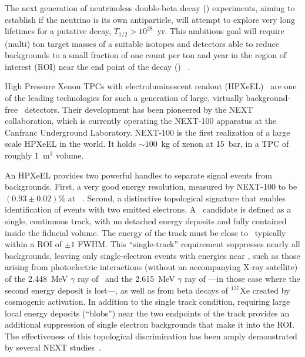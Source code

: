 \documentclass[pdflatex,iicol,sn-mathphys-num]{sn-jnl}
\begin{document}
The next generation of neutrinoless double-beta decay (\bbonu) experiments, aiming to establish if the neutrino is its own antiparticle, will attempt to explore very long lifetimes for a putative decay, $T_{1/2} > 10^{28}$~yr. This ambitious goal will require (multi) ton target masses of a suitable isotopes and detectors able to reduce backgrounds to a small fraction of one count per ton and year in the region of interest (ROI) near the end point of the decay (\Qbb) ~\cite{Gomez-Cadenas:2023vca}. 

High Pressure Xenon TPCs with electroluminescent readout (HPXeEL)~\cite{Gomez-Cadenas:2019ges} are one of the leading technologies for such a generation of large, virtually background-free \bbonu\ detectors. Their development has been pioneered by the NEXT collaboration, which is currently operating the NEXT-100 apparatus \cite{NEXT:2025yqw} at the Canfranc Underground Laboratory. NEXT-100 is the first realization of a large scale HPXeEL in the world. It holds $\sim100$~kg of xenon at 15~bar, in a TPC of roughly 1~m$^3$ volume.  

An HPXeEL provides two powerful handles to separate signal events from backgrounds. First, a very good energy resolution, measured by NEXT-100 to be $(0.93 \pm 0.02)$\% at \Qbb~\cite{NEXT:2025ozn}. Second, a distinctive topological signature that enables identification of events with two emitted electrons. A \bbonu\ candidate is defined as a single, continuous track, with no detached energy deposits and fully contained inside the fiducial volume. The energy of the track must be close to \Qbb\, typically within a ROI of $\pm 1$ FWHM.  This ``single-track'' requirement suppresses nearly all backgrounds, leaving only single-electron events with energies near \Qbb, such as those arising from photoelectric interactions (without an accompanying X-ray satellite) of the 2.448~MeV $\gamma$ ray of \BI\ and the 2.615~MeV $\gamma$ ray of \TL ---in those case where the second energy deposit is lost---, as well as from beta decays of $^{137}$Xe created by cosmogenic activation. In addition to the single track condition, requiring large local energy deposits (``blobs'') near the two endpoints of the track provides an additional suppression of single electron backgrounds that make it into the ROI. The effectiveness of this topological discrimination has been amply demonstrated by several NEXT studies~\cite{Ferrario:2015kta, Ferrario:2019kwg, NEXT:2021vzd, Kekic2021, NEXT:2021pjq}. 
\end{document}
